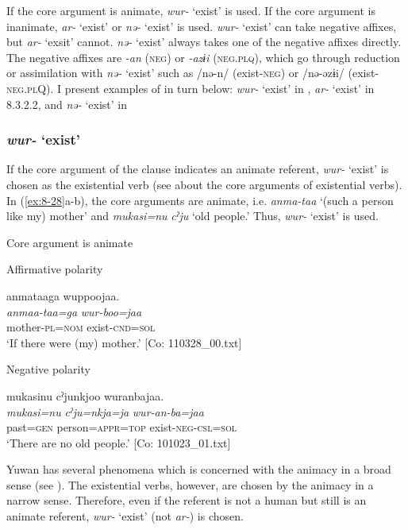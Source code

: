 If the core argument is animate, \textit{wur-} ‘exist’ is used. If the core argument is inanimate, \textit{ar-} ‘exist’ or \textit{nə-} ‘exist’ is used. \textit{wur-} ‘exist’ can take negative affixes, but \textit{ar-} ‘exsit’ cannot. \textit{nə-} ‘exist’ always takes one of the negative affixes directly. The negative affixes are \textit{-an} (\textsc{neg}) or \textit{-azɨi} (\textsc{neg}.\textsc{plq}), which go through reduction or assimilation with \textit{nə-} ‘exist’ such as /nə-n/ (exist-\textsc{neg}) or /nə-əzɨi/ (exist-\textsc{neg}.\textsc{pl}Q). I present examples of  in turn below: \textit{wur-} ‘exist’ in , \textit{ar-} ‘exist’ in 8.3.2.2, and \textit{nə-} ‘exist’ in 

\subsubsection{\textit{wur-} ‘exist’}

If the core argument of the clause indicates an animate referent, \textit{wur-} ‘exist’ is chosen as the existential verb (see  about the core arguments of existential verbs). In (\ref{ex:8-28}a-b), the core arguments are animate, i.e. \textit{anma-taa} ‘(such a person like my) mother’ and \textit{mukasi=nu} \textit{cˀju} ‘old people.’ Thus, \textit{wur-} ‘exist’ is used.

\ea\label{ex:8-28}  Core argument is animate

\ea Affirmative polarity

{\TM}
\glll  anmataaga  wuppoojaa.\\
\textit{anmaa-taa=ga}  \textit{wur-boo=jaa}\\
mother-\textsc{pl}=\textsc{nom}  exist-\textsc{cnd}=\textsc{sol}\\
\glt ‘If there were (my) mother.’ [Co: 110328\_00.txt]

\ex Negative polarity

{\TM}
\glll  mukasinu  cˀjunkjoo  wuranbajaa.\\
\textit{mukasi=nu}  \textit{cˀju=nkja=ja}  \textit{wur-an-ba=jaa}\\
past=\textsc{gen}  person=\textsc{appr}=\textsc{top}  exist-\textsc{neg}-\textsc{csl}=\textsc{sol}\\
\glt ‘There are no old people.’ [Co: 101023\_01.txt]
\z

Yuwan has several phenomena which is concerned with the animacy in a broad sense (see ). The existential verbs, however, are chosen by the animacy in a narrow sense. Therefore, even if the referent is not a human but still is an animate referent, \textit{wur-} ‘exist’ (not \textit{ar-}) is chosen.

